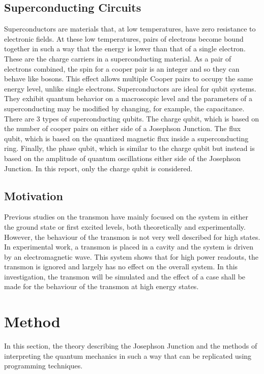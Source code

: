 \documentclass[11pt]{article}
\begin{document}
 \subsection{Superconducting Circuits}
Superconductors are materials that, at low temperatures, have zero resistance to electronic fields. At these low temperatures, pairs of electrons become bound together in such a way that the energy is lower than that of a single electron. These are the charge carriers in a superconducting material. As a pair of electrons combined, the spin for a cooper pair is an integer and so they can behave like bosons. This effect allows multiple Cooper pairs to occupy the same energy level, unlike single electrons. Superconductors are ideal for qubit systems. They exhibit quantum behavior on a macroscopic level and the parameters of a superconducting may be modified by changing, for example, the capacitance. There are 3 types of superconducting qubits. The charge qubit, which is based on the number of cooper pairs on either side of a Josephson Junction. The flux qubit, which is based on the quantized magnetic flux inside a superconducting ring. Finally, the phase qubit, which is similar to the charge qubit but instead is based on the amplitude of quantum oscillations either side of the Josephson Junction. In this report, only the charge qubit is considered.

  \subsection{Motivation}
Previous studies on the transmon have mainly focused on the system in either the ground state or first excited levels, both theoretically and experimentally. However, the behaviour of the transmon is not very well described for high states. In experimental work, a transmon is placed in a cavity and the system is driven by an electromagnetic wave. This system shows that for high power readouts, the transmon is ignored and largely has no effect on the overall system. In this investigation, the transmon will be simulated and the effect of a case shall be made for the behaviour of the transmon at high energy states.

    \section{Method}
    In this section, the theory describing the Josephson Junction and the methods of interpreting the quantum mechanics in such a way that can be replicated using programming techniques.
\end{document}
